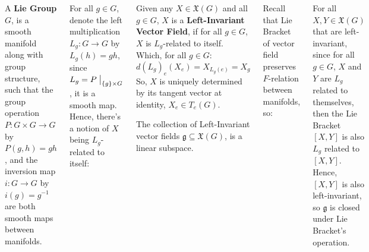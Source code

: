 \documentclass[20pt,margin=0.9in,innermargin=-4.5in,blockverticalspace=-0.25in]{tikzposter}
\begin{document}
\begin{columns}
{        \begin{definitionBox}
            A \textbf{Lie Group} $G$, is a smooth manifold along with group structure, such that the group operation $P:G\times G\rightarrow G$ by $P(g,h) = gh$, and the inversion map $i:G\rightarrow G$ by $i(g)=g^{-1}$ are both smooth maps between manifolds.
        \end{definitionBox}

        For all $g\in G$, denote the left multiplication $L_g:G\rightarrow G$ by $L_g(h)=gh$,
        since $L_g = P\bigm|_{\{g\}\times G}$, it is a smooth map. Hence, there's a notion of $X$ being $L_g$-related to itself:

        \begin{definitionBox}
            Given any $X\in\mathfrak{X}(G)$ and all $g\in G$, $X$ is a \textbf{Left-Invariant Vector Field}, if for all $g\in G$, $X$ is $L_g$-related to itself. Which, for all $g\in G$: 
            $$d(L_g)_e(X_e) = X_{L_g(e)} = X_g$$ 
            So, $X$ is uniquely determined by its tangent vector at identity, $X_e\in T_e(G)$.

            The collection of Left-Invariant vector fields $\mathfrak{g}\subseteq \mathfrak{X}(G)$, is a linear subspace. 
            
        \end{definitionBox}

        Recall that Lie Bracket of vector field preserves $F$-relation between manifolds, so:
        \begin{theoremBox}
            For all $X,Y\in\mathfrak{X}(G)$ that are left-invariant, since for all $g\in G$, $X$ and $Y$ are $L_g$ related to themselves, then the Lie Bracket $[X,Y]$ is also $L_g$ related to $[X,Y]$. Hence, $[X,Y]$ is also left-invariant, so $\mathfrak{g}$ is closed under Lie Bracket's operation.
        \end{theoremBox}
    }


\end{columns}
\end{document}
